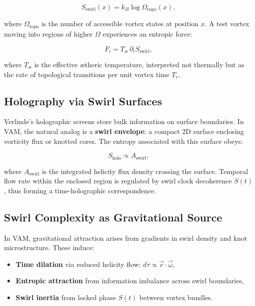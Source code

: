 \begin{equation}
S_{\text{swirl}}(x) = k_B \log \Omega_{\text{topo}}(x),
\end{equation}

where \( \Omega_{\text{topo}} \) is the number of accessible vortex states at position \( x \). A test vortex moving into regions of higher \( \Omega \) experiences an entropic force:

\begin{equation}
F_i = T_{\text{æ}} \, \partial_i S_{\text{swirl}},
\end{equation}

where \( T_{\text{æ}} \) is the effective \ae{}theric temperature, interpreted not thermally but as the rate of topological transitions per unit vortex time \( T_v \).

\subsection*{Holography via Swirl Surfaces}

Verlinde’s holographic screens store bulk information on surface boundaries. In VAM, the natural analog is a \textbf{swirl envelope}: a compact 2D surface enclosing vorticity flux or knotted cores. The entropy associated with this surface obeys:

\begin{equation}
S_{\text{holo}} \propto A_{\text{swirl}},
\end{equation}

where \( A_{\text{swirl}} \) is the integrated helicity flux density crossing the surface. Temporal flow rate within the enclosed region is regulated by swirl clock decoherence \( S(t) \), thus forming a time-holographic correspondence.

\subsection*{Swirl Complexity as Gravitational Source}

In VAM, gravitational attraction arises from gradients in swirl density and knot microstructure. These induce:

\begin{itemize}
    \item \textbf{Time dilation} via reduced helicity flow: \( d\tau \propto \vec{v} \cdot \vec{\omega} \),
    \item \textbf{Entropic attraction} from information imbalance across swirl boundaries,
    \item \textbf{Swirl inertia} from locked phase \( S(t) \) between vortex bundles.
\end{itemize}

